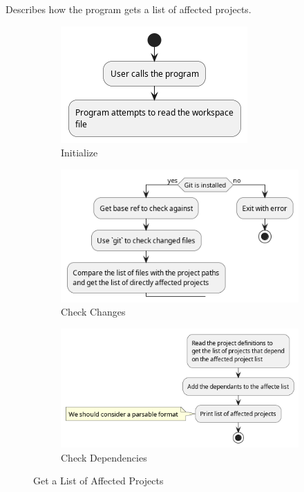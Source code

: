 \documentclass[11pt]{article}
\begin{document}
Describes how the program gets a list of affected projects.

\begin{figure}[htbp]
  \centering
  \begin{subfigure}{0.35\linewidth}
    \includegraphics[width=\linewidth]{diags/get_affected_activity.png}
    \caption{Initialize}
  \end{subfigure}
  \begin{subfigure}{0.45\linewidth}
    \includegraphics[width=\linewidth]{diags/get_affected_activity_001.png}
    \caption{Check Changes}
  \end{subfigure}
  \begin{subfigure}{0.5\linewidth}
    \includegraphics[width=\linewidth]{diags/get_affected_activity_002.png}
    \caption{Check Dependencies}
  \end{subfigure}
  \caption{\label{fig:act_aff}Get a List of Affected Projects}
\end{figure}
\end{document}
